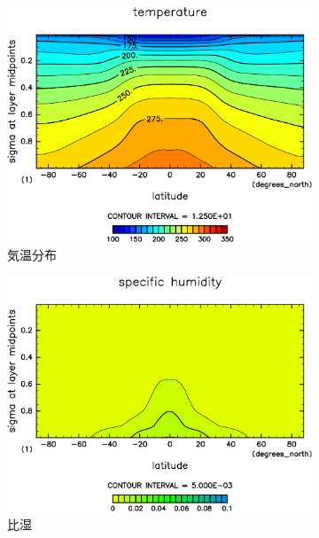 \documentclass[body]{subfiles}
\begin{document}
\begin{figure}[t]
\begin{subfigure}{.4\textwidth}
		\includegraphics[width=\columnwidth]{S1366/Temp,time=14600:14965-crop-rotate.pdf}
		\caption{気温分布}
	\end{subfigure}
	\begin{subfigure}{.4\textwidth}
		\centering
		\includegraphics[width=\columnwidth]{S1366/QH2OVap,time=14600:14965-crop-rotate.pdf}
		\caption{比湿}
	\end{subfigure}
	\begin{subfigure}{.4\textwidth}
		\centering

\end{subfigure}
\end{figure}
\end{document}
